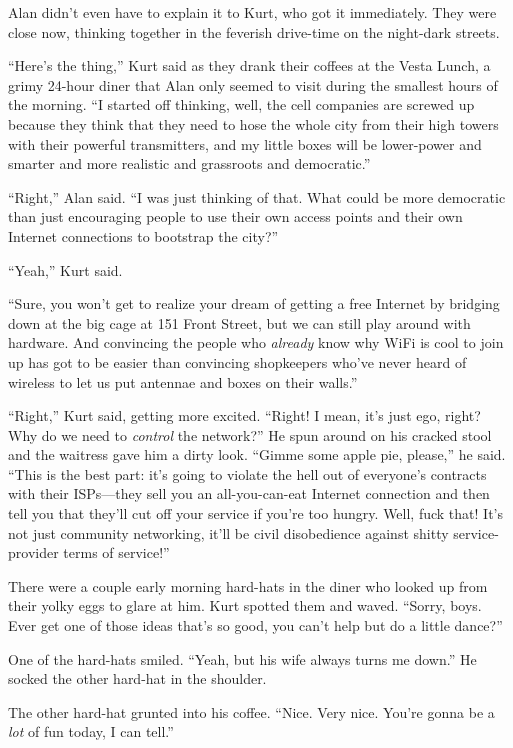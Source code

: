 \documentclass{article}
\begin{document}
Alan didn't even have to explain it to Kurt, who got it immediately. 
They were close now, thinking together in the feverish drive-time on
the night-dark streets.

``Here's the thing,'' Kurt said as they drank their coffees at the
Vesta Lunch, a grimy 24-hour diner that Alan only seemed to visit
during the smallest hours of the morning.  ``I started off thinking,
well, the cell companies are screwed up because they think that they
need to hose the whole city from their high towers with their powerful
transmitters, and my little boxes will be lower-power and smarter and
more realistic and grassroots and democratic.''

``Right,'' Alan said.  ``I was just thinking of that.  What could be
more democratic than just encouraging people to use their own access
points and their own Internet connections to bootstrap the city?''

``Yeah,'' Kurt said.

``Sure, you won't get to realize your dream of getting a free Internet
by bridging down at the big cage at 151 Front Street, but we can still
play around with hardware.  And convincing the people who
\textit{already} know why WiFi is cool to join up has got to be easier
than convincing shopkeepers who've never heard of wireless to let us
put antennae and boxes on their walls.''

``Right,'' Kurt said, getting more excited.  ``Right!  I mean, it's
just ego, right?  Why do we need to \textit{control} the network?'' He
spun around on his cracked stool and the waitress gave him a dirty
look.  ``Gimme some apple pie, please,'' he said.  ``This is the best
part:  it's going to violate the hell out of everyone's contracts with
their ISPs---they sell you an all-you-can-eat Internet connection and
then tell you that they'll cut off your service if you're too hungry. 
Well, fuck that!  It's not just community networking, it'll be civil
disobedience against shitty service-provider terms of service!''

There were a couple early morning hard-hats in the diner who looked up
from their yolky eggs to glare at him.  Kurt spotted them and waved. 
``Sorry, boys.  Ever get one of those ideas that's so good, you can't
help but do a little dance?''

One of the hard-hats smiled.  ``Yeah, but his wife always turns me
down.'' He socked the other hard-hat in the shoulder.

The other hard-hat grunted into his coffee.  ``Nice.  Very nice. 
You're gonna be a \textit{lot} of fun today, I can tell.''
\end{document}
